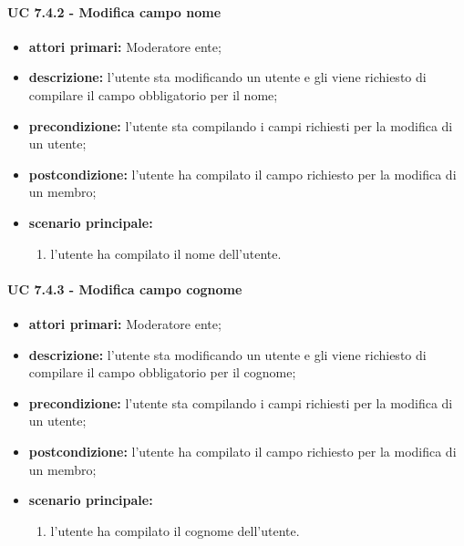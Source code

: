 			\paragraph{UC 7.4.2 - Modifica campo nome}
			\begin{itemize}
				\item \textbf{attori primari:} Moderatore ente;
				\item \textbf{descrizione:} l'utente sta modificando un utente e gli viene richiesto di compilare il campo obbligatorio per il nome;
				\item \textbf{precondizione:} l'utente sta compilando i campi richiesti per la modifica di un utente;
				\item \textbf{postcondizione:} l'utente ha compilato il campo richiesto per la modifica di un membro;
				\item \textbf{scenario principale:}
				\begin{enumerate}
					\item{l'utente ha compilato il nome dell'utente.}
				\end{enumerate}	
			\end{itemize}

			\paragraph{UC 7.4.3 - Modifica campo cognome}
			\begin{itemize}
				\item \textbf{attori primari:} Moderatore ente;
				\item \textbf{descrizione:} l'utente sta modificando un utente e gli viene richiesto di compilare il campo obbligatorio per il cognome;
				\item \textbf{precondizione:} l'utente sta compilando i campi richiesti per la modifica di un utente;
				\item \textbf{postcondizione:} l'utente ha compilato il campo richiesto per la modifica di un membro;
				\item \textbf{scenario principale:}
				\begin{enumerate}
					\item{l'utente ha compilato il cognome dell'utente.}
				\end{enumerate}	
			\end{itemize}

			
